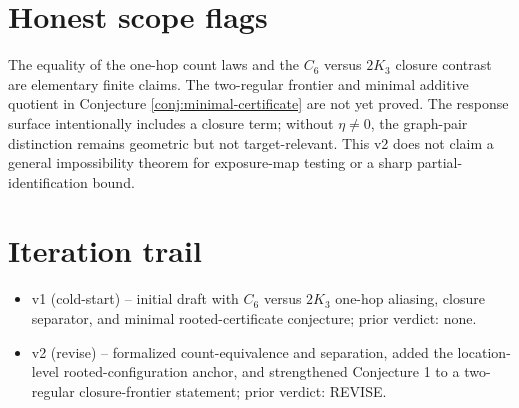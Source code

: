 \documentclass[11pt]{article}
\theoremstyle{definition}
\theoremstyle{plain}
\theoremstyle{remark}
\begin{document}
\section{Honest scope flags}
The equality of the one-hop count laws and the \(C_6\) versus \(2K_3\) closure contrast are elementary finite claims. The two-regular frontier and minimal additive quotient in Conjecture \ref{conj:minimal-certificate} are not yet proved. The response surface intentionally includes a closure term; without \(\eta\ne0\), the graph-pair distinction remains geometric but not target-relevant. This v2 does not claim a general impossibility theorem for exposure-map testing or a sharp partial-identification bound.

\section{Iteration trail}
\begin{itemize}[leftmargin=*]
\item v1 (cold-start) -- initial draft with \(C_6\) versus \(2K_3\) one-hop aliasing, closure separator, and minimal rooted-certificate conjecture; prior verdict: none.
\item v2 (revise) -- formalized count-equivalence and separation, added the location-level rooted-configuration anchor, and strengthened Conjecture 1 to a two-regular closure-frontier statement; prior verdict: REVISE.
\end{itemize}
\end{document}
